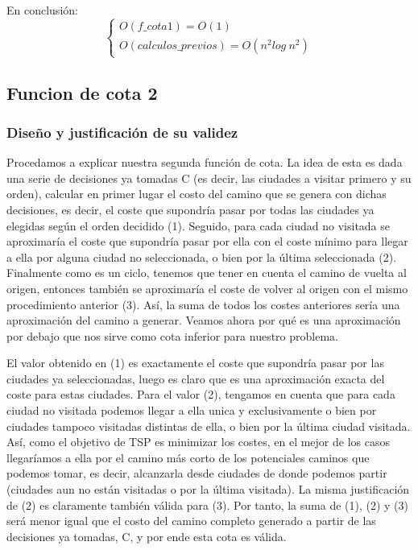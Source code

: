 \documentclass{article}
\begin{document}
En conclusión:
\begin{equation*}
    \left\{\begin{array}{llc}
        O(f\_cota1) = O(1) \\
        O(calculos\_previos) = O(n^{2}log\:n^{2})
    \end{array} \right.
\end{equation*}

\subsection{Funcion de cota 2}
\subsubsection{Diseño y justificación de su validez}

Procedamos a explicar nuestra segunda función de cota. La idea de esta es dada una serie de decisiones ya tomadas C (es decir, las ciudades a visitar primero y su orden), calcular en primer lugar el costo del camino que se genera con dichas decisiones, es decir, el coste que supondría pasar por todas las ciudades ya elegidas según el orden decidido (1). Seguido, para cada ciudad no visitada se aproximaría el coste que supondría pasar por ella con el coste mínimo para llegar a ella por alguna ciudad no seleccionada, o bien por la última seleccionada (2). 
Finalmente como es un ciclo, tenemos que tener en cuenta el camino de vuelta al origen, entonces también se aproximaría el coste de volver
al origen con el mismo procedimiento anterior (3). Así, la suma de todos los costes anteriores sería una aproximación del camino a generar. Veamos ahora por qué es una aproximación por debajo que nos sirve como cota inferior para nuestro problema.

El valor obtenido en (1) es exactamente el coste que supondría pasar por las ciudades ya seleccionadas, luego es claro que es una aproximación exacta del coste para estas ciudades. Para el valor (2), tengamos en cuenta que para cada ciudad no visitada podemos llegar a ella unica y exclusivamente o bien por ciudades tampoco visitadas distintas de ella, o bien por la última  ciudad visitada. Así, como el objetivo de TSP es minimizar los costes, en el mejor de los casos llegaríamos a ella por el camino más corto de los potenciales caminos que podemos tomar, es decir, alcanzarla desde ciudades de donde podemos partir (ciudades aun no están visitadas o por la última visitada). La misma justificación de (2) es claramente también válida para (3). Por tanto, la suma de (1), (2) y (3) será menor igual que el costo del camino completo generado a partir de las decisiones ya tomadas, C, y por ende esta cota es válida. \\ 
\end{document}
